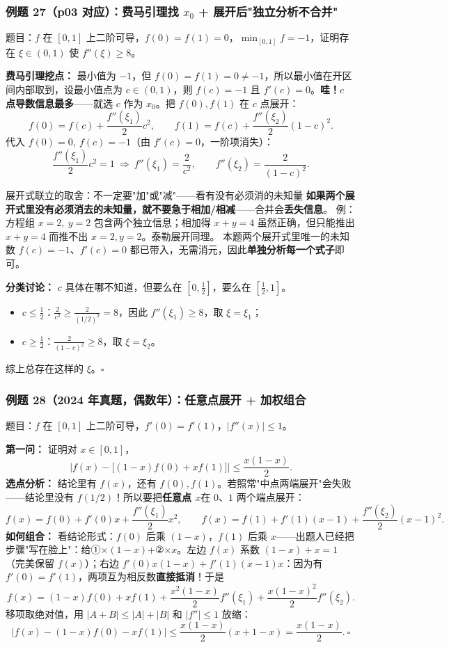 \documentclass[a4paper]{article}
\begin{document}
\subsubsection{例题 27（p03 对应）：费马引理找 $x_0$ + 展开后"独立分析不合并"}

题目：$f$ 在 $[0,1]$ 上二阶可导，$f(0)=f(1)=0$，$\min_{[0,1]}f=-1$，证明存在 $\xi\in(0,1)$ 使 $f''(\xi)\ge 8$。

\textbf{费马引理挖点：} 最小值为 $-1$，但 $f(0)=f(1)=0\neq-1$，所以最小值在开区间内部取到，设最小值点为 $c\in(0,1)$，则 $f(c)=-1$ 且 $f'(c)=0$。\textbf{哇！$c$ 点导数信息最多}——就选 $c$ 作为 $x_0$。把 $f(0),f(1)$ 在 $c$ 点展开：
\[
f(0)=f(c)+\frac{f''(\xi_1)}{2}c^2,\qquad f(1)=f(c)+\frac{f''(\xi_2)}{2}(1-c)^2 .
\]
代入 $f(0)=0,\ f(c)=-1$（由 $f'(c)=0$，一阶项消失）：
\[
\frac{f''(\xi_1)}{2}c^2=1\ \Rightarrow\ f''(\xi_1)=\frac{2}{c^2},\qquad f''(\xi_2)=\frac{2}{(1-c)^2}.
\]

\begin{importantbox}{展开式联立的取舍：不一定要"加"或"减"——看有没有必须消的未知量}
\textbf{如果两个展开式里没有必须消去的未知量，就不要急于相加/相减}——合并会\textbf{丢失信息}。
例：方程组 $x=2,\ y=2$ 包含两个独立信息；相加得 $x+y=4$ 虽然正确，但只能推出 $x+y=4$ 而推不出 $x=2,y=2$。泰勒展开同理。
本题两个展开式里唯一的未知数 $f(c)=-1$、$f'(c)=0$ 都已带入，无需消元，因此\textbf{单独分析每一个式子}即可。
\end{importantbox}

\textbf{分类讨论：} $c$ 具体在哪不知道，但要么在 $[0,\frac12]$，要么在 $[\frac12,1]$。
\begin{itemize}
\item $c\le\frac12$：$\frac{2}{c^2}\ge \frac{2}{(1/2)^2}=8$，因此 $f''(\xi_1)\ge8$，取 $\xi=\xi_1$；
\item $c\ge\frac12$：$\frac{2}{(1-c)^2}\ge8$，取 $\xi=\xi_2$。
\end{itemize}
综上总存在这样的 $\xi$。$\square$

\subsubsection{例题 28（2024 年真题，偶数年）：任意点展开 + 加权组合}

题目：$f$ 在 $[0,1]$ 上二阶可导，$f'(0)=f'(1)$，$|f''(x)|\le 1$。

\textbf{第一问：} 证明对 $x\in[0,1]$，
\[
\Big|f(x)-\big[(1-x)f(0)+xf(1)\big]\Big|\le \frac{x(1-x)}{2}.
\]
\textbf{选点分析：} 结论里有 $f(x)$，还有 $f(0),f(1)$。若照常"中点两端展开"会失败——结论里没有 $f(1/2)$！所以要把\textbf{任意点 $x$}在 $0$、$1$ 两个端点展开：
\[
f(x)=f(0)+f'(0)x+\frac{f''(\xi_1)}{2}x^2,\qquad f(x)=f(1)+f'(1)(x-1)+\frac{f''(\xi_2)}{2}(x-1)^2 .
\]
\textbf{如何组合：} 看结论形式：$f(0)$ 后乘 $(1-x)$，$f(1)$ 后乘 $x$——出题人已经把步骤"写在脸上"：给①×$(1-x)$+②×$x$。左边 $f(x)$ 系数 $(1-x)+x=1$（完美保留 $f(x)$）；右边 $f'(0)x(1-x)+f'(1)(x-1)x$：因为有 $f'(0)=f'(1)$，两项互为相反数\textbf{直接抵消}！于是
\[
f(x)=(1-x)f(0)+xf(1)+\frac{x^2(1-x)}{2}f''(\xi_1)+\frac{x(1-x)^2}{2}f''(\xi_2).
\]
移项取绝对值，用 $|A+B|\le|A|+|B|$ 和 $|f''|\le1$ 放缩：
\[
|f(x)-(1-x)f(0)-xf(1)|\le\frac{x(1-x)}{2}(x+1-x)=\frac{x(1-x)}{2}.\ \square
\]
\end{document}
